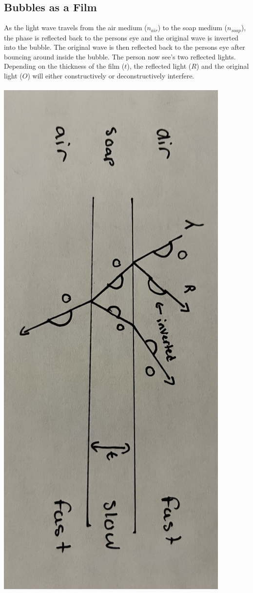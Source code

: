 \documentclass{article}
\begin{document}
\subsection{Bubbles as a Film}
As the light wave travels from the air medium ($n_{air}$) to the soap medium ($n_{soap}$), the phase is reflected back to the persons eye and the original wave is inverted into the bubble. The original wave is then reflected back to the persons eye after bouncing around inside the bubble. The person now see's two reflected lights. Depending on the thickness of the film ($t$), the reflected light ($R$) and the original light ($O$) will either constructively or deconstructively interfere.\\\\
\includegraphics[scale=0.05, angle=90, origin=c]{images/bubble_lens}
\vspace{-1.5cm}
\end{document}

